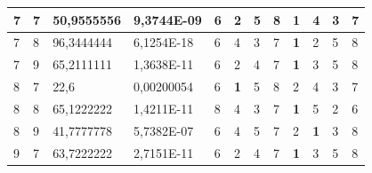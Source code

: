 \documentclass[conference]{IEEEtran}
\begin{document}
\begin{table}[]
\begin{tabular}{|llll|llllllll|}
		\multicolumn{1}{|l|}{7}   & \multicolumn{1}{l|}{7}         & \multicolumn{1}{l|}{50,9555556}    & 9,3744E-09 & \multicolumn{1}{l|}{6}   & \multicolumn{1}{l|}{2}          & \multicolumn{1}{l|}{5}          & \multicolumn{1}{l|}{8}   & \multicolumn{1}{l|}{\textbf{1}} & \multicolumn{1}{l|}{4}          & \multicolumn{1}{l|}{3}          & 7                      \\ \hline
		\multicolumn{1}{|l|}{7}   & \multicolumn{1}{l|}{8}         & \multicolumn{1}{l|}{96,3444444}    & 6,1254E-18 & \multicolumn{1}{l|}{6}   & \multicolumn{1}{l|}{4}          & \multicolumn{1}{l|}{3}          & \multicolumn{1}{l|}{7}   & \multicolumn{1}{l|}{\textbf{1}} & \multicolumn{1}{l|}{2}          & \multicolumn{1}{l|}{5}          & 8                      \\ \hline
		\multicolumn{1}{|l|}{7}   & \multicolumn{1}{l|}{9}         & \multicolumn{1}{l|}{65,2111111}    & 1,3638E-11 & \multicolumn{1}{l|}{6}   & \multicolumn{1}{l|}{2}          & \multicolumn{1}{l|}{4}          & \multicolumn{1}{l|}{7}   & \multicolumn{1}{l|}{\textbf{1}} & \multicolumn{1}{l|}{3}          & \multicolumn{1}{l|}{5}          & 8                      \\ \hline
		\multicolumn{1}{|l|}{8}   & \multicolumn{1}{l|}{7}         & \multicolumn{1}{l|}{22,6}          & 0,00200054 & \multicolumn{1}{l|}{6}   & \multicolumn{1}{l|}{\textbf{1}} & \multicolumn{1}{l|}{5}          & \multicolumn{1}{l|}{8}   & \multicolumn{1}{l|}{2}          & \multicolumn{1}{l|}{4}          & \multicolumn{1}{l|}{3}          & 7                      \\ \hline
		\multicolumn{1}{|l|}{8}   & \multicolumn{1}{l|}{8}         & \multicolumn{1}{l|}{65,1222222}    & 1,4211E-11 & \multicolumn{1}{l|}{8}   & \multicolumn{1}{l|}{4}          & \multicolumn{1}{l|}{3}          & \multicolumn{1}{l|}{7}   & \multicolumn{1}{l|}{\textbf{1}} & \multicolumn{1}{l|}{5}          & \multicolumn{1}{l|}{2}          & 6                      \\ \hline
		\multicolumn{1}{|l|}{8}   & \multicolumn{1}{l|}{9}         & \multicolumn{1}{l|}{41,7777778}    & 5,7382E-07 & \multicolumn{1}{l|}{6}   & \multicolumn{1}{l|}{4}          & \multicolumn{1}{l|}{5}          & \multicolumn{1}{l|}{7}   & \multicolumn{1}{l|}{2}          & \multicolumn{1}{l|}{\textbf{1}} & \multicolumn{1}{l|}{3}          & 8                      \\ \hline
		\multicolumn{1}{|l|}{9}   & \multicolumn{1}{l|}{7}         & \multicolumn{1}{l|}{63,7222222}    & 2,7151E-11 & \multicolumn{1}{l|}{6}   & \multicolumn{1}{l|}{2}          & \multicolumn{1}{l|}{4}          & \multicolumn{1}{l|}{7}   & \multicolumn{1}{l|}{\textbf{1}} & \multicolumn{1}{l|}{3}          & \multicolumn{1}{l|}{5}          & 8                      \\ \hline

\end{tabular}
\end{table}
\end{document}
